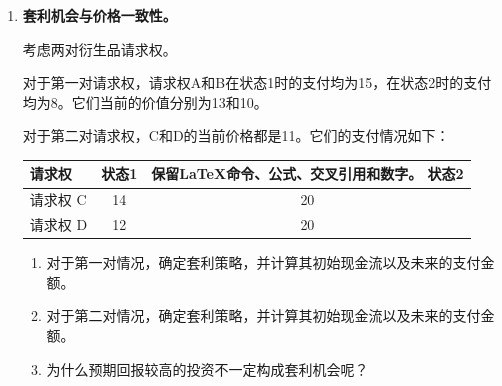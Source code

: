 \begin{enumerate}
在“上状态”下，或有请求权可获得20的赔偿；在“下状态”下，可获得2的赔偿。

\begin{enumerate}

\item 确定需要持有的证券A和B的数量，以履行该或有请求权。

\item 请标明哪些部分是长句，哪些部分是短句。同时保留所有LaTeX命令、公式表达、交叉引用以及数字的内容。

\item 计算当前投资组合的成本。

\item 解释为什么在无套利条件下，请求权的当前价值必须等于复制成本。

\end{enumerate}


\item \textbf{套利机会与价格一致性。}

考虑两对衍生品请求权。

对于第一对请求权，请求权A和B在状态1时的支付均为15，在状态2时的支付均为8。它们当前的价值分别为13和10。

对于第二对请求权，C和D的当前价格都是11。它们的支付情况如下：

\begin{center}
\begin{tabular}{lcc}
\toprule
\textbf{请求权}
& \textbf{状态1}
& \textbf{保留LaTeX命令、公式、交叉引用和数字。  
状态2} \\
\midrule
请求权 C & 14 & 20 \\
请求权 D & 12 & 20 \\
\bottomrule
\end{tabular}
\end{center}

\begin{enumerate}

\item 对于第一对情况，确定套利策略，并计算其初始现金流以及未来的支付金额。

\item 对于第二对情况，确定套利策略，并计算其初始现金流以及未来的支付金额。

\item 为什么预期回报较高的投资不一定构成套利机会呢？

\end{enumerate}


\end{enumerate}

